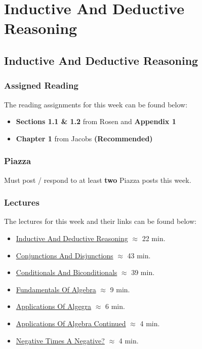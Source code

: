 \clearpage

\newcommand{\ChapTitle}{Inductive And Deductive Reasoning}
\newcommand{\SectionTitle}{Inductive And Deductive Reasoning}

\chapter{\ChapTitle}
\section{\SectionTitle}

\subsection{Assigned Reading}

The reading assignments for this week can be found below:

\begin{itemize}
    \item \textbf{Sections 1.1 \& 1.2} from Rosen and \textbf{Appendix 1}
    \item \textbf{Chapter 1} from Jacobs \textbf{(Recommended)}
\end{itemize}

\subsection{Piazza}

Must post / respond to at least \textbf{two} Piazza posts this week.  

\subsection{Lectures}

The lectures for this week and their links can be found below:

\begin{itemize}
    \item \href{https://drive.explaineverything.com/thecode/GYWSZFB}{Inductive And Deductive Reasoning} $\approx$ 22 min.
    \item \href{https://applied.cs.colorado.edu/mod/hvp/view.php?id=51549}{Conjunctions And Disjunctions} $\approx$ 43 min.
    \item \href{https://applied.cs.colorado.edu/mod/hvp/view.php?id=51550}{Conditionals And Biconditionals} $\approx$ 39 min.
    \item \href{https://applied.cs.colorado.edu/mod/hvp/view.php?id=51552}{Fundamentals Of Algebra} $\approx$ 9 min.
    \item \href{https://applied.cs.colorado.edu/mod/hvp/view.php?id=51553}{Applications Of Algegra} $\approx$ 6 min.
    \item \href{https://applied.cs.colorado.edu/mod/hvp/view.php?id=51554}{Applications Of Algebra Continued} $\approx$ 4 min.
    \item \href{https://applied.cs.colorado.edu/mod/hvp/view.php?id=51555}{Negative Times A Negative?} $\approx$ 4 min.
\end{itemize}

